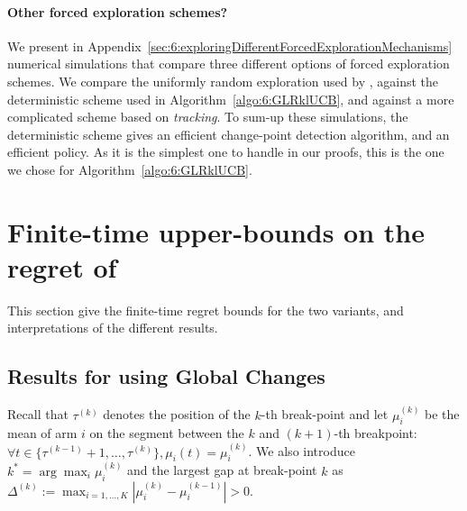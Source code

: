 \paragraph{Other forced exploration schemes?}
%
We present in Appendix~\ref{sec:6:exploringDifferentForcedExplorationMechanisms} numerical simulations that compare three different options of forced exploration schemes.
We compare the uniformly random exploration used by \CUSUMUCB, against the deterministic scheme used in Algorithm~\ref{algo:6:GLRklUCB}, and against a more complicated scheme based on \emph{tracking}.
To sum-up these simulations, the deterministic scheme gives an efficient change-point detection algorithm, and an efficient \GLRklUCB{} policy.
As it is the simplest one to handle in our proofs, this is the one we chose for Algorithm~\ref{algo:6:GLRklUCB}.



\section{Finite-time upper-bounds on the regret of \GLRklUCB}
\label{sec:6:RegretAnalysis}

This section give the finite-time regret bounds for the two variants, and interpretations of the different results.

\subsection{Results for \GLRklUCB{} using Global Changes}

Recall that $\tau^{(k)}$ denotes the position of the $k$-th break-point and let $\mu_i^{(k)}$ be the mean of arm $i$ on the segment between the $k$ and $(k+1)$-th breakpoint:
$\forall t \in \{ \tau^{(k-1)}+1, \dots, \tau^{(k)} \}, \mu_{i}(t) = \mu_i^{(k)}$. We also introduce $k^* = \arg\max_i \mu_i^{(k)} $ and the largest gap at break-point $k$ as $\Delta^{(k)} := \max_{i=1,\dots,K} |\mu_i^{(k)} - \mu_i^{(k-1)}| >0$.


